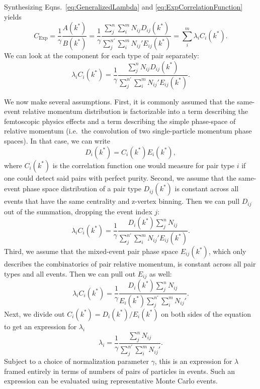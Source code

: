 Synthesizing Eqns.\ \ref{eq:GeneralizedLambda} and \ref{eq:ExpCorrelationFunction} yields
\begin{equation}
C_{\mathrm{Exp}} = \frac{1}{\gamma} \frac{A(k^*)}{B(k^*)} = \frac{1}{\gamma}\frac{\sum_j^n \sum_i^m N_{ij} D_{ij}(k^*)}{\sum_j^{n'} \sum_i^m N_{ij}' E_{ij}(k^*)} =  \sum_{i}^{m} \lambda_{i} C_{i}(k^*).
\end{equation}
We can look at the component for each type of pair separately:
\begin{equation}
\lambda_i C_i(k^*) = \frac{1}{\gamma}\frac{\sum_j^n N_{ij} D_{ij}(k^*)}{\sum_j^{n'} \sum_i^m N_{ij}' E_{ij}(k^*)}.
\end{equation}

We now make several assumptions. First, it is commonly assumed that the same-event relative momentum distribution is factorizable into a term describing the femtoscopic physics effects and a term describing the simple phase-space of relative momentum (i.e.\ the convolution of two single-particle momentum phase spaces). 
In that case, we can write
\begin{equation}
\label{eq:DEqualCE}
D_i(k^*) = C_i(k^*)E_i(k^*),
\end{equation}
where $C_i(k^*)$ is the correlation function one would measure for pair type $i$ if one could detect said pairs with perfect purity.
Second, we assume that the same-event phase space distribution of a pair type $D_{ij}(k^*)$ is constant across all events that have the same centrality and z-vertex binning. Then we can pull $D_{ij}$ out of the summation, dropping the event index $j$:
\begin{equation}
\lambda_i C_i(k^*) = \frac{1}{\gamma}\frac{D_{i}(k^*)\sum_j^n N_{ij} }{\sum_j^{n'} \sum_i^m N_{ij}' E_{ij}(k^*)}.
\end{equation}
Third, we assume that the mixed-event pair phase space $E_{ij}(k^*)$, which only describes the combinatorics of pair relative momentum, is constant across all pair types and all events. Then we can pull out $E_{ij}$ as well:
\begin{equation}
\lambda_i C_i(k^*) = \frac{1}{\gamma}\frac{D_{i}(k^*)\sum_j^n N_{ij} }{E_{i}(k^*)\sum_j^{n'} \sum_i^m N_{ij}'}.
\end{equation}
Next, we divide out $C_i(k^*) = D_i(k^*) /E_i(k^*)$ on both sides of the equation to get an expression for $\lambda_i$
\begin{equation}
\label{eq:LambdaPartialSolution}
\lambda_i= \frac{1}{\gamma}\frac{\sum_j^n N_{ij} }{\sum_j^{n'} \sum_i^m N_{ij}'}.
\end{equation}
Subject to a choice of normalization parameter $\gamma$, this is an expression for $\lambda$ framed entirely in terms of numbers of pairs of particles in events.  Such an expression can be evaluated using representative Monte Carlo events.

